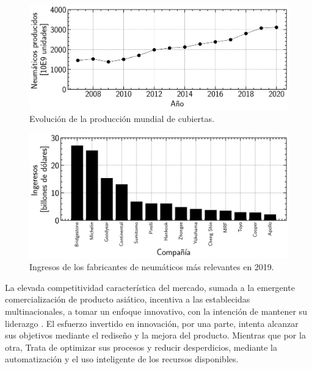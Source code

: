 \begin{figure}[h]
	\begin{center}
		\includegraphics[width=\textwidth]{fig/1_global_prod_evo.PNG}
	\end{center}
	\caption{Evolución de la producción mundial de cubiertas.}
	\label{fig:1_global_prod_evo}
\end{figure}

 \begin{figure}[h]
	\begin{center}
		\includegraphics[width=\textwidth]{fig/1_brand.revenue.PNG}
	\end{center}
	\caption{Ingresos de los fabricantes de neumáticos más relevantes en 2019.}
	\label{fig:1_brand_revenue}
\end{figure}

La elevada competitividad característica del mercado,
sumada a la emergente comercialización de producto asiático,
incentiva a las establecidas multinacionales, a tomar un enfoque innovativo,
con la intención de mantener su liderazgo \citep{chicu2020current}.
El esfuerzo invertido en innovación,
por una parte, intenta alcanzar sus objetivos
mediante el rediseño y la mejora del producto.
Mientras que por la otra,
Trata de optimizar sus procesos y reducir desperdicios,
mediante la automatización y el uso inteligente de los recursos disponibles.

